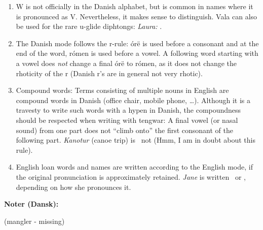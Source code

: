 \documentclass[a4paper]{article}
\begin{document}
\begin{enumerate}
  is completely silent.  No single tengwa is used here, as there is no
  mapping to similar words in other languages where a single tengwa
  would be used.  In the contrary, these words map almost one-to-one
  to Icelandic (close to Old Norse), where hj is pronounced as two
  joined consonant sounds (hard to pronounce for non-Icelanders).
  Presumably, Icelandic elves would write these words with hyarmen
  anna, which is shifted to halla anna in Danish to reflect that the H
  is silent.  Other words with silent h are also written with halla
  instead of hyarmen.\label{notehalla}
\item W is not officially in the Danish alphabet, but is common in
  names where it is pronounced as V.  Nevertheless, it makes sense to
  distinguish.  Vala can also be used for the rare u-glide diphtongs:
  \emph{Laura:} \Tlambe\Tvala\TTthreedots\Troomen\Ttelco\TTthreedots.\label{noteW}
\item The Danish mode follows the r-rule: \'or\"e is used before a
  consonant and at the end of the word, r\'omen is used before a
  vowel.  A following word starting with a vowel does \emph{not}
  change a final \'or\"e to r\'omen, as it does not change the
  rhoticity of the r (Danish r's are in general not very rhotic).\label{noteR}
\item Compound words: Terms consisting of multiple nouns in English
  are compound words in Danish (office chair, mobile phone, \ldots).
  Although it is a travesty to write such words with a hypen in
  Danish, the compoundness should be respected when writing with
  tengwar: A final vowel (or nasal sound) from one part does not
  ``climb onto'' the first consonant of the following part.
  \emph{Kanotur} (canoe trip) is
  \Tquesse\Tnuumen\TTthreedots\Ttelco\TTrightcurl
  \Ttinco\Toore\TTleftcurl ~not
  \Tquesse\Tnuumen\TTthreedots\Ttinco\TTrightcurl\Toore\TTleftcurl\Ts
  (Hmm, I am in doubt about this rule).
\item English loan words and names are written according to the
  English mode, if the original pronunciation is approximately
  retained.  \emph{Jane} is written
  \Tanga\Tnuumen\TTthreedots\TTdotbelow ~or
  \Tanna\Tnuumen\TTthreedots\Ttelco\TTacute, depending on how she
  pronounces it.
\end{enumerate}

{\Large \textbf{Noter (Dansk):}\par}

(mangler - missing)
\end{document}

